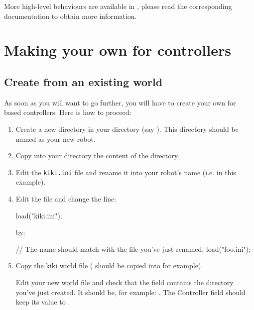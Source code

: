 More high-level behaviours are available in , please read
the corresponding documentation to obtain more information.


\section{Making your own \urbi for \webots controllers}

\subsection{Create from an existing world}

As soon as you will want to go further, you will have to create your
own \urbi for \webots based controllers. Here is how to proceed:

\begin{enumerate}

\item Create a new directory in your  directory (say
  ). This directory should be named as your new robot.

\item Copy into your  directory the content of the
   directory.

\item Edit the \nolinkurl{kiki.ini} file and rename it into your
  robot's name (i.e.  in this example).

\item Edit the  file and change the line:

\begin{urbiunchecked}
load("kiki.ini");
\end{urbiunchecked}

by:

\begin{urbiunchecked}
// The name should match with the file you've just renamed.
load("foo.ini");
\end{urbiunchecked}

\item Copy the kiki world file ( should be
  copied into  for example).

  Edit your new world file and check that the field
   contains the directory you've just created. It
  should be, for example: .  The Controller field should
  keep its value to .
\end{enumerate}

